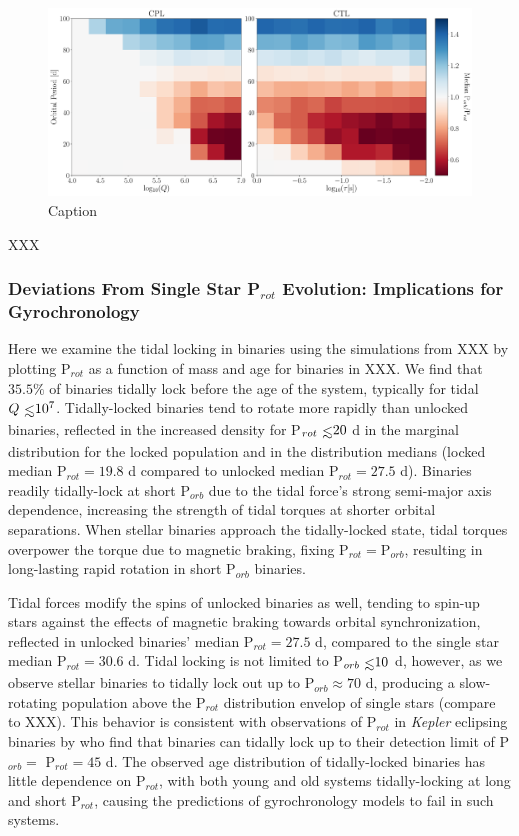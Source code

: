 \documentclass[twocolumn]{aastex61}
\def\lsim{~\rlap{$<$}{\lower 1.0ex\hbox{$\sim$}}}
\newcommand{\kepler}[0]{\textit{Kepler}\xspace}
\begin{document}
\begin{figure}[ht]
	\includegraphics[width=\textwidth]{../Plots/qTauPorbRatioHist.pdf}
   \caption{Caption}%
    \label{fig:qTauLock}%
\end{figure}

XXX

\subsubsection{Deviations From Single Star P$_{rot}$ Evolution: Implications for Gyrochronology}

Here we examine the tidal locking in binaries using the simulations from XXX by plotting P$_{rot}$ as a function of mass and age for binaries in XXX. We find that $35.5\%$ of binaries tidally lock before the age of the system, typically for tidal $Q \lsim 10^7$. Tidally-locked binaries tend to rotate more rapidly than unlocked binaries, reflected in the increased density for P$_{rot} \lsim 20$ d in the marginal distribution for the locked population and in the distribution medians (locked median P$_{rot} = 19.8$ d compared to unlocked median P$_{rot} = 27.5$ d). Binaries readily tidally-lock at short P$_{orb}$ due to the tidal force's strong semi-major axis dependence, increasing the strength of tidal torques at shorter orbital separations. When stellar binaries approach the tidally-locked state, tidal torques overpower the torque due to magnetic braking, fixing P$_{rot} = $P$_{orb}$, resulting in long-lasting rapid rotation in short P$_{orb}$ binaries. 

Tidal forces modify the spins of unlocked binaries as well, tending to spin-up stars against the effects of magnetic braking towards orbital synchronization, reflected in unlocked binaries' median P$_{rot} = 27.5$ d, compared to the single star median P$_{rot} = 30.6$ d. Tidal locking is not limited to P$_{orb} \lsim 10$ d, however, as we observe stellar binaries to tidally lock out up to P$_{orb} \approx 70$ d, producing a slow-rotating population above the P$_{rot}$ distribution envelop of single stars (compare to XXX). This behavior is consistent with observations of P$_{rot}$ in \kepler eclipsing binaries by \citet{Lurie2017} who find that binaries can tidally lock up to their detection limit of P$_{orb} = $ P$_{rot} = 45$ d. The observed age distribution of tidally-locked binaries has little dependence on P$_{rot}$, with both young and old systems tidally-locking at long and short P$_{rot}$, causing the predictions of gyrochronology models to fail in such systems. 
\end{document}
